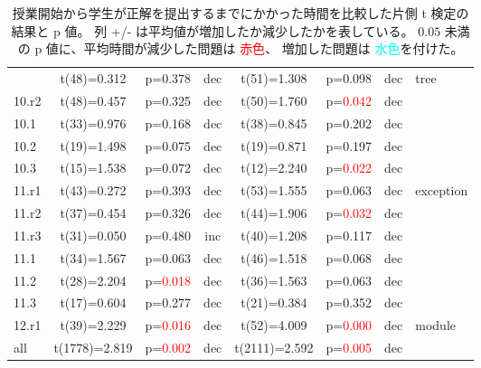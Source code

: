 \begin{table}
\begin{center}
\begin{tabular}{|l||c|c|c||c|c|c||l|}
    & t(48)=0.312 & p=0.378 & dec
    & t(51)=1.308 & p=0.098 & dec
    & tree\\ \cline{1-7}
    10.r2
    & t(48)=0.457 & p=0.325 & dec
    & t(50)=1.760 & p=\textcolor{red}{0.042} & dec
    & \\ \cline{1-7}
    10.1
    & t(33)=0.976 & p=0.168 & dec
    & t(38)=0.845 & p=0.202 & dec
    & \\ \cline{1-7}
    10.2
    & t(19)=1.498 & p=0.075 & dec
    & t(19)=0.871 & p=0.197 & dec
    & \\ \cline{1-7}
    10.3
    & t(15)=1.538 & p=0.072 & dec
    & t(12)=2.240 & p=\textcolor{red}{0.022} & dec
    & \\ \hline
    11.r1
    & t(43)=0.272 & p=0.393 & dec
    & t(53)=1.555 & p=0.063 & dec
    & exception\\ \cline{1-7}
    11.r2
    & t(37)=0.454 & p=0.326 & dec
    & t(44)=1.906 & p=\textcolor{red}{0.032} & dec
    & \\ \cline{1-7}
    11.r3
    & t(31)=0.050 & p=0.480 & inc
    & t(40)=1.208 & p=0.117 & dec
    & \\ \cline{1-7}
    11.1
    & t(34)=1.567 & p=0.063 & dec
    & t(46)=1.518 & p=0.068 & dec
    & \\ \cline{1-7}
    11.2
    & t(28)=2.204 & p=\textcolor{red}{0.018} & dec
    & t(36)=1.563 & p=0.063 & dec
    & \\ \cline{1-7}
    11.3
    & t(17)=0.604 & p=0.277 & dec
    & t(21)=0.384 & p=0.352 & dec
    & \\ \hline
    12.r1
    & t(39)=2.229 & p=\textcolor{red}{0.016} & dec
    & t(52)=4.009 & p=\textcolor{red}{0.000} & dec
    & module\\ \hline
    all
    & t(1778)=2.819 & p=\textcolor{red}{0.002} & dec
    & t(2111)=2.592 & p=\textcolor{red}{0.005} & dec
    & \\ \hline
  \end{tabular}
  \end{center}
  \caption[拡張されたステッパを利用した年と他の年の学生が正答するまでの時間の比較]{
    授業開始から学生が正解を提出するまでにかかった時間を比較した片側 t 検定の結果と p 値。
    列 +/- は平均値が増加したか減少したかを表している。
    $0.05$ 未満の p 値に、平均時間が減少した問題は \textcolor{red}{赤色}、
    増加した問題は \textcolor{cyan}{水色}を付けた。
  } 
  \label{TableTTest}
\end{table}
